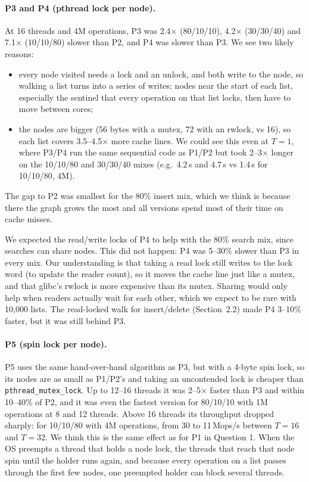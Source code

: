 \paragraph{P3 and P4 (pthread lock per node).}
At 16 threads and 4M operations, P3 was 2.4$\times$ (80/10/10), 4.2$\times$ (30/30/40) and 7.1$\times$ (10/10/80) slower than P2, and P4 was slower than P3. We see two likely reasons:
\begin{itemize}
\item every node visited needs a lock and an unlock, and both write to the node, so walking a list turns into a series of writes;
      nodes near the start of each list, especially the sentinel that every operation on that list locks, then have to move between cores;
\item the nodes are bigger (56 bytes with a mutex, 72 with an rwlock, vs 16), so each list covers 3.5--4.5$\times$ more cache lines.
      We could see this even at $T = 1$, where P3/P4 run the same sequential code as P1/P2 but took 2--3$\times$ longer on the 10/10/80 and 30/30/40 mixes
      (e.g.\ 4.2\,s and 4.7\,s vs 1.4\,s for 10/10/80, 4M).
\end{itemize}
The gap to P2 was smallest for the 80\% insert mix, which we think is because there the graph grows the most and all versions spend most of their time on cache misses.

We expected the read/write locks of P4 to help with the 80\% search mix, since searches can share nodes. This did not happen: P4 was 5--30\% slower than P3 in every mix.
Our understanding is that taking a read lock still writes to the lock word (to update the reader count), so it moves the cache line just like a mutex, and that glibc's rwlock is more expensive than its mutex.
Sharing would only help when readers actually wait for each other, which we expect to be rare with 10{,}000 lists.
The read-locked walk for insert/delete (Section~2.2) made P4 3--10\% faster, but it was still behind P3.

\paragraph{P5 (spin lock per node).}
P5 uses the same hand-over-hand algorithm as P3, but with a 4-byte spin lock, so its nodes are as small as P1/P2's and taking an uncontended lock is cheaper than \texttt{pthread\_mutex\_lock}.
Up to 12--16 threads it was 2--5$\times$ faster than P3 and within 10--40\% of P2, and it was even the fastest version for 80/10/10 with 1M operations at 8 and 12 threads.
Above 16 threads its throughput dropped sharply: for 10/10/80 with 4M operations, from 30 to 11\,Mops/s between $T=16$ and $T=32$.
We think this is the same effect as for P1 in Question 1. When the OS preempts a thread that holds a node lock, the threads that reach that node spin until the holder runs again,
and because every operation on a list passes through the first few nodes, one preempted holder can block several threads.

